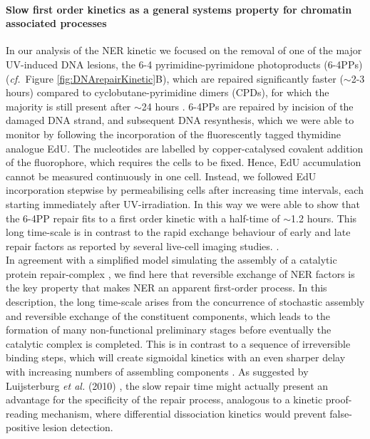 \paragraph{Slow first order kinetics as a general systems property for chromatin associated processes}
In our analysis of the NER kinetic we focused on the removal of one of the major UV-induced DNA lesions, the 6-4 pyrimidine-pyrimidone photoproducts (6-4PPs) (\textit{cf.}\ Figure \ref{fig:DNArepairKinetic}B), which are repaired significantly faster ($\sim$2-3 hours) compared to cyclobutane-pyrimidine dimers (CPDs), for which the majority is still present after $\sim$24 hours \cite{Smerdon1978,vanHoffen:1995:EMBO-J:7835346,Luijsterburg2010}. 6-4PPs are repaired by incision of the damaged DNA strand, and subsequent DNA resynthesis, which we were able to monitor by following the incorporation of the fluorescently tagged thymidine analogue EdU. The nucleotides are labelled by copper-catalysed covalent addition of the fluorophore, which requires the cells to be fixed. Hence, EdU accumulation cannot be measured continuously in one cell. Instead, we followed EdU incorporation stepwise by permeabilising cells after increasing time intervals, each starting immediately after UV-irradiation. In this way we were able to show that the 6-4PP repair fits to a first order kinetic with a half-time of $\sim$1.2 hours.         
This long time-scale is in contrast to the rapid exchange behaviour of early and late repair factors as reported by several live-cell imaging studies. \cite{Houtsmuller1999,Volker2001,Hoogstraten2002,Rademakers2003,Mone2004,Zotter2006,Hoogstraten2008,Luijsterburg2010}. \\
In agreement with a simplified model simulating the assembly of a catalytic protein repair-complex \cite{Terstiege2010}, we find here that reversible exchange of NER factors is the key property that makes NER an apparent first-order process. In this description, the long time-scale arises from the concurrence of stochastic assembly and reversible exchange of the constituent components, which leads to the formation of many non-functional preliminary stages before eventually the catalytic complex is completed. This is in contrast to a sequence of irreversible binding steps, which will create sigmoidal kinetics with an even sharper delay with increasing numbers of assembling components \cite{Terstiege2010}. As suggested by Luijsterburg \textit{et al.} (2010) \cite{Luijsterburg2010}, the slow repair time might actually present an advantage for the specificity of the repair process, analogous to a kinetic proof-reading mechanism, where differential dissociation kinetics would prevent false-positive lesion detection. \\ 
